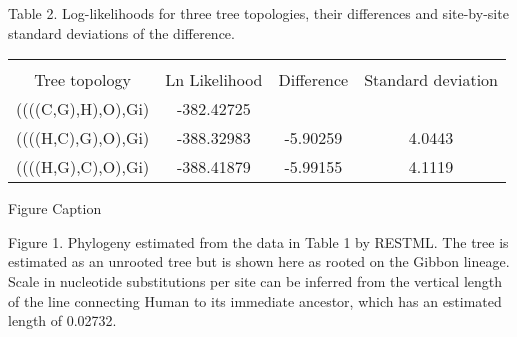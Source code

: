 \newpage

Table 2.  Log-likelihoods for three tree topologies, their differences and
site-by-site standard deviations of the difference.
\medskip

\begin{tabular}{c c c c}
                &               &            &                     \\
  Tree topology & Ln Likelihood & Difference & Standard deviation  \\
  ((((C,G),H),O),Gi) & -382.42725    &            &               \\
  ((((H,C),G),O),Gi) & -388.32983    & -5.90259   &   4.0443\\
  ((((H,G),C),O),Gi) & -388.41879    & -5.99155   &   4.1119
\end{tabular}

\newpage

\centerline{Figure Caption}

Figure 1.  Phylogeny estimated from the data in Table 1 by RESTML.  The tree
is estimated as an unrooted tree but is shown here as rooted on the
Gibbon lineage.  Scale in nucleotide substitutions per site can be inferred
from the vertical length of the line connecting Human to its immediate ancestor,
which has an estimated length of 0.02732.

